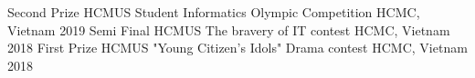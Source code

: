 



\begin{cvhonors}

  \cvhonor
    {Second Prize} %
    {HCMUS Student Informatics Olympic Competition} %
    {HCMC, Vietnam} %
    {2019} %
  \cvhonor
    {Semi Final} %
    {HCMUS The bravery of IT contest} %
    {HCMC, Vietnam} %
    {2018} %
  \cvhonor
    {First Prize} %
    {HCMUS "Young Citizen's Idols" Drama contest} %
    {HCMC, Vietnam} %
    {2018} %
\end{cvhonors}
